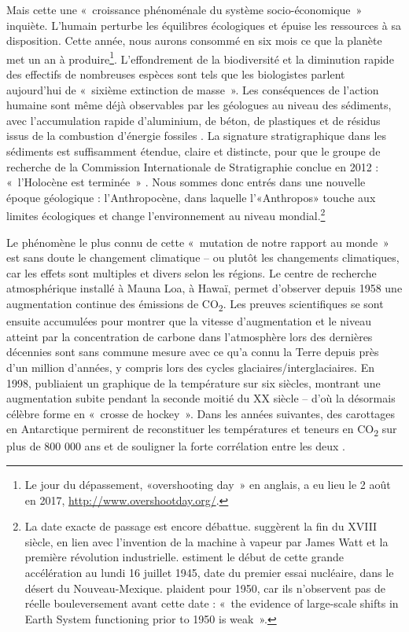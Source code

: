 Mais cette une «~croissance phénoménale du système socio-économique~» \citep{Steffen2004} inquiète. L’humain perturbe les équilibres écologiques et épuise les ressources à sa disposition. Cette année, nous aurons consommé en six mois ce que la planète met un an à produire\footnote{Le jour du dépassement, «overshooting day~» en anglais, a eu lieu le 2 août en 2017, \url{http://www.overshootday.org/}.}. L’effondrement de la biodiversité et la diminution rapide des effectifs de nombreuses espèces sont tels que les biologistes parlent aujourd’hui de «~sixième extinction de masse~». Les conséquences de l'action humaine sont même déjà observables par les géologues au niveau des sédiments, avec l'accumulation rapide d'aluminium, de béton, de plastiques et de résidus issus de la combustion d'énergie fossiles \citep{Waters2016}. La signature stratigraphique dans les sédiments est suffisamment étendue, claire et distincte, pour que le groupe de recherche de la Commission Internationale de Stratigraphie conclue en 2012 : «~l'Holocène est terminée~» \citep{Latour2014}. Nous sommes donc entrés dans une nouvelle époque géologique : l'Anthropocène, dans laquelle l'«Anthropos» touche aux limites écologiques et change l'environnement au niveau mondial.\footnote{La date exacte de passage est encore débattue. \citet{Crutzen2000} suggèrent la fin du XVIII siècle, en lien avec l'invention de la machine à vapeur par James Watt et la première révolution industrielle. \citet{Zalasiewicz2014} estiment le début de cette grande accélération au lundi 16 juillet 1945, date du premier essai nucléaire, dans le désert du Nouveau-Mexique. \citet{Steffen2015} plaident pour 1950, car ils n'observent pas de réelle bouleversement avant cette date : «~the evidence of large-scale shifts in Earth System functioning prior to 1950 is weak~».}

Le phénomène le plus connu de cette «~mutation de notre rapport au monde~» \citep{Latour2015} est sans doute le changement climatique -- ou plutôt les changements climatiques, car les effets sont multiples et divers selon les régions.
Le centre de recherche atmosphérique installé à Mauna Loa, à Hawaï, permet d'observer depuis 1958 une augmentation continue des émissions de CO\textsubscript{2}. Les preuves scientifiques se sont ensuite accumulées pour montrer que la vitesse d'augmentation et le niveau atteint par la concentration de carbone dans l'atmosphère lors des dernières décennies sont sans commune mesure avec ce qu'a connu la Terre depuis près d'un million d'années, y compris lors des cycles glaciaires/interglaciaires. En 1998, \citet{Mann1998} publiaient un graphique de la température sur six siècles, montrant une augmentation subite pendant la seconde moitié du XX siècle -- d'où la désormais célèbre forme en «~crosse de hockey~». 
Dans les années suivantes, des carottages en Antarctique permirent de reconstituer les températures et teneurs en CO\textsubscript{2} sur plus de 800 000 ans et de souligner la forte corrélation entre les deux \citep{Petit1999,Luthi2008}.


